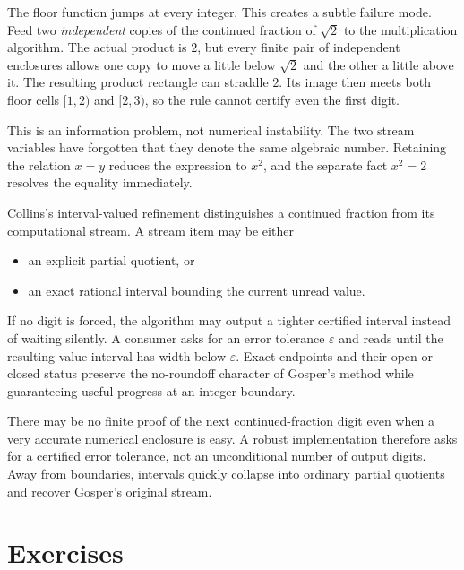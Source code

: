 The floor function jumps at every integer.  This creates a subtle failure mode.
Feed two \emph{independent} copies of the continued fraction of $\sqrt2$ to the
multiplication algorithm.  The actual product is $2$, but every finite pair of
independent enclosures allows one copy to move a little below $\sqrt2$ and the
other a little above it.  The resulting product rectangle can straddle $2$.
Its image then meets both floor cells $[1,2)$ and $[2,3)$, so the rule cannot
certify even the first digit.

This is an information problem, not numerical instability.  The two stream
variables have forgotten that they denote the same algebraic number.  Retaining
the relation $x=y$ reduces the expression to $x^2$, and the separate fact
$x^2=2$ resolves the equality immediately.

Collins's interval-valued refinement distinguishes a continued fraction from
its computational stream.  A stream item may be either
\begin{itemize}
  \item an explicit partial quotient, or
  \item an exact rational interval bounding the current unread value.
\end{itemize}
If no digit is forced, the algorithm may output a tighter certified interval
instead of waiting silently.  A consumer asks for an error tolerance
$\varepsilon$ and reads until the resulting value interval has width below
$\varepsilon$.  Exact endpoints and their open-or-closed status preserve the
no-roundoff character of Gosper's method while guaranteeing useful progress at
an integer boundary.

\begin{warningbox}[title={Digits and numerical accuracy are different requests}]
There may be no finite proof of the next continued-fraction digit even when a
very accurate numerical enclosure is easy.  A robust implementation therefore
asks for a certified error tolerance, not an unconditional number of output
digits.  Away from boundaries, intervals quickly collapse into ordinary
partial quotients and recover Gosper's original stream.
\end{warningbox}

\section{Exercises}

